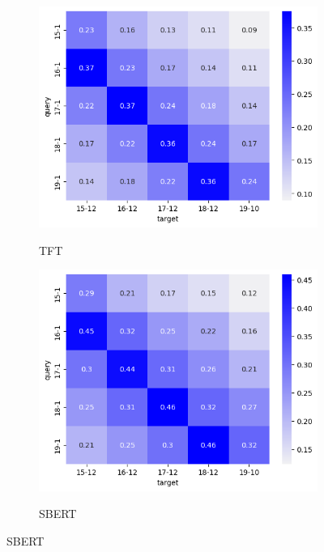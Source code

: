 \begin{figure}
    \begin{subfigure}{0.48\linewidth}
    \includegraphics[width=\linewidth,alt={Heatmap for TFT.}]{stylometryExtensions/figures/heat/tft.png}
    \caption{TFT}
    \label{fig:tempral_vary:tft}
    \end{subfigure}
    \begin{subfigure}{0.48\linewidth}
    \includegraphics[width=\linewidth,alt={Heatmap for SBERT.}]{stylometryExtensions/figures/heat/sbert.png}
    \caption{SBERT}
    \label{fig:tempral_vary:sbert}
    \end{subfigure}


\end{figure}
